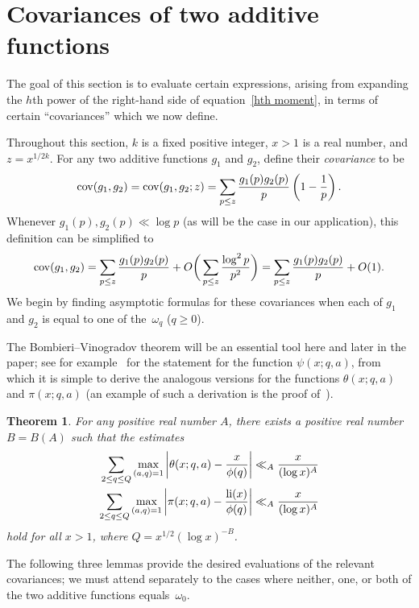\documentclass[12pt,reqno]{amsart}
\newtheorem{theorem}{Theorem}[section]
\theoremstyle{definition}
\newcommand{\cov}{\mathop{\rm cov}\nolimits}
\newcommand{\li}{\mathop{\rm li}\nolimits}
\begin{document}
\section{Covariances of two additive functions}\label{term estimation}

The goal of this section is to evaluate certain expressions, arising from expanding the $h$th power of the right-hand side of equation~\eqref{hth moment}, in terms of certain ``covariances'' which we now define.

Throughout this section, $k$ is a fixed positive integer, $x>1$ is a real number, and $z = x^{1/2k}$.
For any two additive functions $g_1$ and $g_2$, define their \emph{covariance} to be
\[
\cov(g_1, g_2) = \cov(g_1, g_2;z) = \sum_{p \leq z} \frac{g_1(p)g_2(p)}{p} \left( 1 - \frac{1}{p} \right).
\]
Whenever $g_1(p),g_2(p) \ll \log p$ (as will be the case in our application), this definition can be simplified to
\begin{equation}  \label{cov with O(1)}
\cov(g_1, g_2) = \sum_{p \leq z} \frac{g_1(p)g_2(p)}{p} + O\bigg( \sum_{p \leq z} \frac{\log^2 p}{p^2} \bigg) = \sum_{p \leq z} \frac{g_1(p)g_2(p)}{p} + O(1).
\end{equation}
We begin by finding asymptotic formulas for these covariances when each of $g_1$ and $g_2$ is equal to one of the~$\omega_q$ ($q\ge0$).

The Bombieri--Vinogradov theorem will be an essential tool here and later in the paper; see for example~\cite[Theorem 17.1]{ik04} for the statement for the function $\psi(x;q,a)$, from which it is simple to derive the analogous versions for the functions $\theta(x;q,a)$ and $\pi(x;q,a)$ (an example of such a derivation is the proof of~\cite[Corollary 1.4]{AH}).

\begin{theorem}\label{bombvino}
For any positive real number $A$, there exists a positive real number $B=B(A)$ such that the estimates
\begin{align}
\sum_{2\le q \leq Q} \max_{(a, q) = 1} \left| \theta(x; q, a) - \frac{x}{\phi(q)} \right| &\ll_A \frac{x}{(\log x)^A} \label{theta BV} \\
\sum_{2\le q \leq Q} \max_{(a, q) = 1} \left| \pi(x; q, a) - \frac{\li(x)}{\phi(q)} \right| &\ll_A \frac{x}{(\log x)^A} \label{pi BV}
\end{align}
hold for all $x>1$, where $Q = x^{1/2}(\log x)^{-B}$.
\end{theorem}

The following three lemmas provide the desired evaluations of the relevant covariances; we must attend separately to the cases where neither, one, or both of the two additive functions equals~$\omega_0$.
\end{document}
